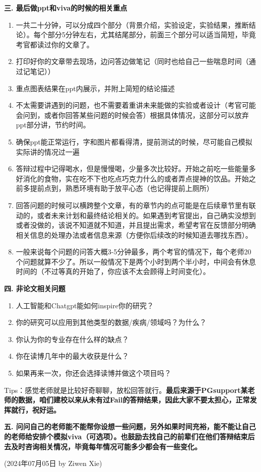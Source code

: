 \textbf{三. 最后做ppt和viva的时候的相关重点}
\begin{enumerate}
    \item 一共二十分钟，可以分成四个部分（背景介绍，实验设定，实验结果，推断结论）。每个部分5分钟左右，尤其结尾部分，前面三个部分可以适当简短，毕竟考官都读过你的文章了。
    \item 打印好你的文章带去现场，边问答边做笔记（同时也给自己一些喘息时间（通过记笔记））
    \item 重点图表结果在ppt内展示，并附上简短的结论描述
    \item 不太需要讲遇到的问题，也不需要着重讲未来能做的实验或者设计（考官可能会问到，或者你回答某些问题的时候会答）根据具体情况，这部分可以放弃ppt部分讲，节约时间。
    \item 确保ppt能正常运行，字和图片都看得清，提前测试的时候，尽可能自己模拟实际讲的情况过一遍
    \item 答辩过程中记得喝水，但是慢慢喝，少量多次比较好。开始之前吃一些能量多好消化的食物，实在吃不下也吃点巧克力什么的或者弄点提神的饮品。开始之前多提前点到，熟悉环境有助于放平心态（也记得提前上厕所）
    \item 回答问题的时候可以横跨整个文章，有的章节内的点可能是在后续章节里有联动的，或者未来计划和最终结论相关的。如果遇到考官提出，自己确实没想到或者没做的，该说不知道就不知道，并且提出需求，希望考官在反馈部分明确相关信息的处理办法或者信息来源（方便你后续改的时候知道去哪找东西）。
    \item 一般来说每个问题的问答大概3-5分钟最多，两个考官的情况下，每个老师20个问题就算不少了。所以一般情况下是两个小时到两个半小时，中间会有休息时间的（不过等真的开始了，你应该不太会顾得上时间变化）。
\end{enumerate}
 
\textbf{四. 非论文相关问题}
\begin{enumerate}
    \item 人工智能和Chatgpt能如何inspire你的研究？
    \item 你的研究可以应用到其他类型的数据/疾病/领域吗？为什么？
    \item 你认为你的专业存在什么样的缺点？
    \item 你在读博几年中的最大收获是什么？
    \item 如果再来一次，你还会选择读博并做这个项目吗？
\end{enumerate}
Tips：感觉老师就是比较好奇聊聊，放松回答就行。\textbf{最后来源于PGsupport某老师的数据，咱们建校以来从未有过Fail的答辩结果，因此大家不要太担心，正常发挥就行，祝好运。} 

\textbf{五. 问问自己的老师能不能帮你设想一些问题，另外如果时间充裕，能不能让自己的老师给安排个模拟viva（可选项）。也鼓励去找自己的前辈们在他们答辩结束后去及时咨询相关情况，毕竟每年情况可能多少都会有一些变化。}

\begin{flushright}
    (2024年07月05日 by Ziwen Xie)
\end{flushright}
